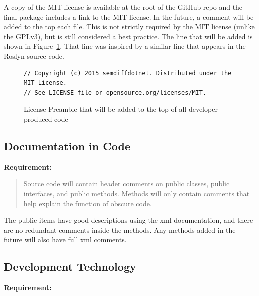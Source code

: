 \documentclass[draftclsnofoot,onecolumn]{IEEEtran}
\begin{document}
A copy of the MIT license is available at the root of the GitHub repo and the 
final package includes a link to the MIT license. In the future, a comment 
will be added to the top each file. This is not strictly required by the MIT 
license (unlike the GPLv3), but is still considered a best practice. The line 
that will be added is shown in Figure~\ref{mitheader}. That line was inspired 
by a similar line that appears in the Roslyn source code.

\begin{figure}[!t]
\centering
\begin{lstlisting}
// Copyright (c) 2015 semdiffdotnet. Distributed under the MIT License. 
// See LICENSE file or opensource.org/licenses/MIT.
\end{lstlisting}
\caption{License Preamble that will be added to the top of all developer 
produced code}
\label{mitheader}
\end{figure}

\subsection{Documentation in Code}%

\textbf{Requirement:}

\begin{quote}

Source code will contain header comments on public classes, public 
interfaces, and public methods. Methods will only contain comments that help 
explain the function of obscure code.

\end{quote}

The public items have good descriptions using the xml documentation, and 
there are no redundant comments inside the methods. Any methods added in the 
future will also have full xml comments.

\subsection{Development Technology}%

\textbf{Requirement:}
\end{document}
